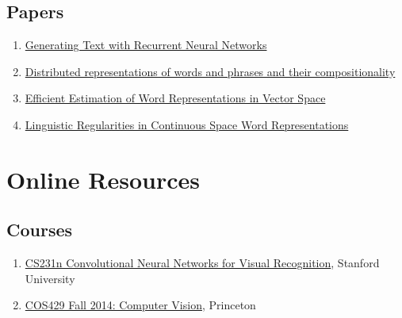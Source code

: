 \documentclass{article}
\begin{document}
\subsection{Papers}
\begin{enumerate}
	\item \href{http://machinelearning.wustl.edu/mlpapers/paper_files/ICML2011Sutskever_524.pdf}{Generating Text with Recurrent Neural Networks}\autocite{sutskever2011generating}
	\item \href{https://arxiv.org/pdf/1310.4546.pdf}{Distributed representations of words and phrases and their compositionality}\autocite{mikolov2013distributed}
	\item \href{https://arxiv.org/pdf/1301.3781.pdf}{Efficient Estimation of Word Representations in Vector Space}\autocite{mikolov2013efficient}
	\item \href{https://www.microsoft.com/en-us/research/wp-content/uploads/2016/02/rvecs.pdf}{Linguistic Regularities in Continuous Space Word Representations}\autocite{mikolov2013linguistic}
\end{enumerate}


\section{Online Resources}
\subsection{Courses}
\begin{enumerate}
	\item \href{http://cs231n.github.io/}{CS231n Convolutional Neural Networks for Visual Recognition}, Stanford University
	\item \href{http://vision.princeton.edu/courses/COS429/2014fa/}{COS429 Fall 2014: Computer Vision}, Princeton
\end{enumerate}
\end{document}
